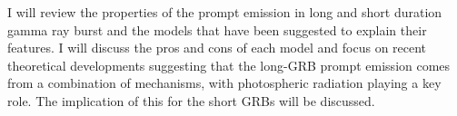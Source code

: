


\bigskip



\bigskip

\noindent I will review the properties of the prompt emission in long and short duration gamma ray burst and the models that have been suggested to explain their features. I will discuss the pros and cons of each model and focus on recent theoretical developments suggesting that the long-GRB prompt emission comes from a combination of mechanisms, with photospheric radiation playing a key role. The implication of this for the short GRBs will be discussed.

